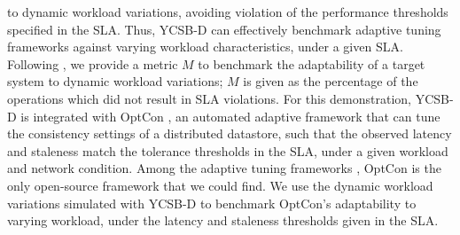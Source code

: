 \documentclass{vldb}
\begin{document}
               to dynamic workload variations, avoiding violation of the performance thresholds specified in the SLA.
               Thus, YCSB-D can effectively benchmark adaptive tuning frameworks \cite{conf/wecwis/YuV00, Terry:2013:CSL:2517349.2522731, Ardekani:2014:SGC:2685048.2685077} %
                against varying workload characteristics, under a given SLA. 
              Following \cite{Terry:2013:CSL:2517349.2522731}, we provide a metric \emph{$M$} to benchmark the adaptability of a target system to dynamic workload variations; $M$ is given as the percentage of the operations which did not result in SLA violations. 
                For this demonstration, YCSB-D is integrated with OptCon \cite{OptCOnCCGRid2016}, an automated adaptive framework that can tune the consistency settings of a distributed datastore, such that the observed latency and staleness match the tolerance thresholds in the SLA, under a given workload and network condition.
                Among the adaptive tuning frameworks \cite{conf/wecwis/YuV00, Terry:2013:CSL:2517349.2522731, Ardekani:2014:SGC:2685048.2685077}, OptCon is the only open-source framework that we could find.  
               We use the dynamic workload variations simulated with YCSB-D to benchmark OptCon's adaptability to varying workload, under the latency and staleness thresholds given in the SLA.   
               
\end{document}
